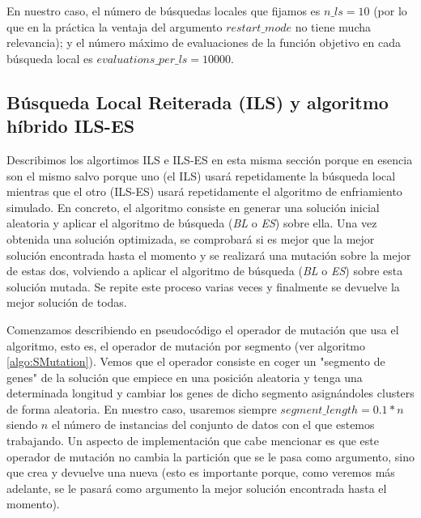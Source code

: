 \documentclass[11pt,a4paper]{article}
\begin{document}
	En nuestro caso, el número de búsquedas locales que fijamos es $n\_ls = 10$ (por lo que en la práctica la ventaja del argumento $restart\_mode$ no tiene mucha relevancia); y el número máximo de evaluaciones de la función objetivo en cada búsqueda local es $evaluations\_per\_ls=10000$.
	
	\subsection{Búsqueda Local Reiterada (ILS) y algoritmo híbrido ILS-ES}
	Describimos los algortimos ILS e ILS-ES en esta misma sección porque en esencia son el mismo salvo porque uno (el ILS) usará repetidamente la búsqueda local mientras que el otro (ILS-ES) usará repetidamente el algoritmo de enfriamiento simulado. En concreto, el algoritmo consiste en generar una solución inicial aleatoria y aplicar el algoritmo de búsqueda (\textit{BL} o \textit{ES}) sobre ella. Una vez obtenida una solución optimizada, se comprobará si es mejor que la mejor solución encontrada hasta el momento y se realizará una mutación sobre la mejor de estas dos, volviendo a aplicar el algoritmo de búsqueda (\textit{BL} o \textit{ES}) sobre esta solución mutada. Se repite este proceso varias veces y finalmente se devuelve la mejor solución de todas.
	
	Comenzamos describiendo en pseudocódigo el operador de mutación que usa el algoritmo, esto es, el operador de mutación por segmento (ver algoritmo \ref{algo:SMutation}). Vemos que el operador consiste en coger un "segmento de genes" de la solución que empiece en una posición aleatoria y tenga una determinada longitud y cambiar los genes de dicho segmento asignándoles clusters de forma aleatoria. En nuestro caso, usaremos siempre $segment\_length = 0.1* n$ siendo $n$ el número de instancias del conjunto de datos con el que estemos trabajando. Un aspecto de implementación que cabe mencionar es que este operador de mutación no cambia la partición que se le pasa como argumento, sino que crea y devuelve una nueva (esto es importante porque, como veremos más adelante, se le pasará como argumento la mejor solución encontrada hasta el momento).
	
\end{document}
